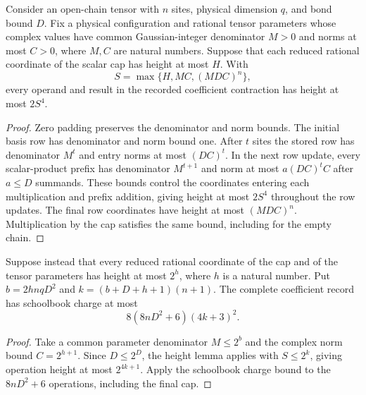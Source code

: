 \begin{lemma}
    \label{lem:lvv_recorded_coefficient_max_height}
    \leanok
    Consider an open-chain tensor with $n$ sites, physical dimension $q$,
    and bond bound $D$. Fix a physical configuration and rational tensor
    parameters whose complex values have common Gaussian-integer
    denominator $M>0$ and norms at most $C>0$, where $M,C$ are natural
    numbers. Suppose that each reduced rational coordinate of the scalar
    cap has height at most $H$. With
    \[
        S=\max\{H,MC,(MDC)^n\},
    \]
    every operand and result in the recorded coefficient contraction has
    height at most $2S^4$.
\end{lemma}
\begin{proof}\leanok
    Zero padding preserves the denominator and norm bounds. The initial
    basis row has denominator and norm bound one. After $t$ sites the
    stored row has denominator $M^t$ and entry norms at most $(DC)^t$.
    In the next row update, every scalar-product prefix has denominator
    $M^{t+1}$ and norm at most $a(DC)^t C$ after $a\le D$ summands.
    These bounds control the coordinates entering each multiplication and
    prefix addition, giving height at most $2S^4$ throughout the row
    updates. The final row coordinates have height at most $(MDC)^n$.
    Multiplication by the cap satisfies the same bound, including for
    the empty chain.
\end{proof}

\begin{lemma}
    \label{lem:lvv_recorded_coefficient_schoolbook_charge}
    \leanok
    Suppose instead that every reduced rational coordinate of the cap
    and of the tensor parameters has height at most $2^h$, where $h$ is
    a natural number. Put $b=2hnqD^2$ and $k=(b+D+h+1)(n+1)$.
    The complete coefficient record has schoolbook charge at most
    \[
        8(8nD^2+6)(4k+3)^2.
    \]
\end{lemma}
\begin{proof}\leanok
    Take a common parameter denominator $M\le 2^b$ and the complex norm
    bound $C=2^{h+1}$. Since $D\le 2^D$, the height lemma applies with
    $S\le 2^k$, giving operation height at most $2^{4k+1}$.
    Apply the schoolbook charge bound to the $8nD^2+6$ operations,
    including the final cap.
\end{proof}

